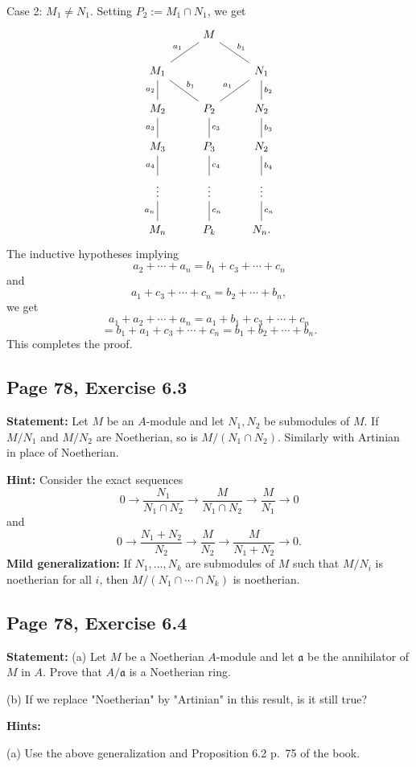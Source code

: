 \documentclass[parskip=half,fontsize=12pt]{scrartcl}%
\newcommand{\mf}{\mathfrak}
\newcommand{\aaa}{\mf a}
\begin{document}
Case 2: $M_1\ne N_1$. Setting $P_2:=M_1\cap N_1$, we get 
$$
\begin{tikzcd}
&M\ar[dl,dash,"a_1"']\ar[dr,dash,"b_1"]\\ 
M_1\ar[d,dash,"a_2"']\ar[dr,dash,"b_1"]&&N_1\ar[d,dash,"b_2"]\ar[dl,dash,"a_1"']\\ 
M_2\ar[d,dash,"a_3"']&P_2\ar[d,dash,"c_3"]&N_2\ar[d,dash,"b_3"]\\ 
M_3\ar[d,dash,"a_4"']&P_3\ar[d,dash,"c_4"]&N_2\ar[d,dash,"b_4"]\\ 
\vdots\ar[d,dash,"a_n"']&\vdots\ar[d,dash,"c_n"]&\vdots\ar[d,dash,"c_n"]\\ 
M_n&P_k&N_n.
\end{tikzcd}
$$ 
The inductive hypotheses implying 
$$
a_2+\cdots+a_n=b_1+c_3+\cdots+c_n
$$ 
and 
$$
a_1+c_3+\cdots+c_n=b_2+\cdots+b_n,%
$$ 
we get 
$$
a_1+a_2+\cdots+a_n=a_1+b_1+c_3+\cdots+c_n
$$ 
$$
=b_1+a_1+c_3+\cdots+c_n=b_1+b_2+\cdots+b_n.
$$ 
This completes the proof.

\subsection{Page 78, Exercise 6.3}%

\textbf{Statement:} Let $M$ be an $A$-module and let $N_1,N_2$ be submodules of $M$. If $M/N_1$ and $M/N_2$ are Noetherian, so is $M/(N_1\cap N_2)$. Similarly with Artinian in place of Noetherian.

\textbf{Hint:} Consider the exact sequences 
$$
0\to\frac{N_1}{N_1\cap N_2}\to\frac M{N_1\cap N_2}\to\frac M{N_1}\to0
$$ 
and 
$$
0\to\frac{N_1+N_2}{N_2}\to\frac M{N_2}\to\frac M{N_1+N_2}\to0.
$$ 
\textbf{Mild generalization:} If $N_1,\dots,N_k$ are submodules of $M$ such that $M/N_i$ is noetherian for all $i$, then $M/(N_1\cap\cdots\cap N_k)$ is noetherian. 

\subsection{Page 78, Exercise 6.4}%

\textbf{Statement:} (a) Let $M$ be a Noetherian $A$-module and let $\aaa$ be the annihilator of $M$ in $A$. Prove that $A/\aaa$ is a Noetherian ring.

(b) If we replace "Noetherian" by "Artinian" in this result, is it still true?

\textbf{Hints:}

(a) Use the above generalization and Proposition 6.2 p.~75 of the book.
\end{document}
